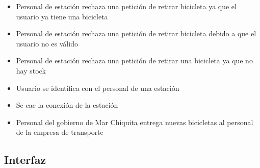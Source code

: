 \documentclass[a4paper, 10pt, twoside]{article}
\begin{document}
\begin{multicols}{2}
\begin{itemize}
    \item Personal de estación rechaza una petición de retirar bicicleta ya que el usuario ya tiene una bicicleta
    \item Personal de estación rechaza una petición de retirar bicicleta debido a que el usuario no es válido
    \item Personal de estación rechaza una petición de retirar una bicicleta ya que no hay stock
    \item Usuario se identifica con el personal de una estación
    \item Se cae la conexión de la estación
    \item Personal del gobierno de Mar Chiquita entrega nuevas bicicletas al personal de la empresa de transporte
  \end{itemize}
\end{multicols}


\subsection{Interfaz}
\end{document}
